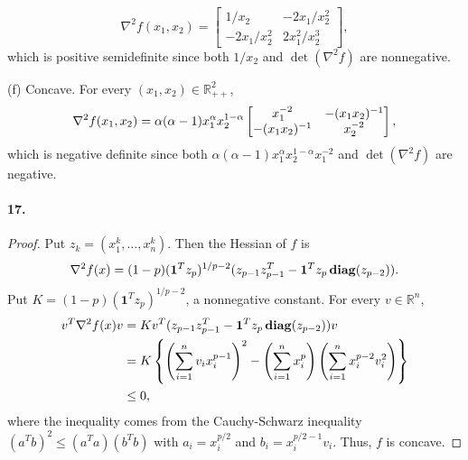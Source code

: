 \begin{solution}
\[      \nabla^2f(x_1,x_2) = \begin{bmatrix}
        1/x_2 & -2x_1/x_2^2 \\ -2x_1/x_2^2 & 2x_1^2/x_2^3
      \end{bmatrix},
    \]
    which is positive semidefinite since both $1/x_2$ and $\det(\nabla^2 f)$ are
    nonnegative. \par
    (f) Concave. For every $(x_1,x_2)\in\mathbb{R}_{++}^2$,
    \[
      \nabla^2f(x_1,x_2) = \alpha(\alpha-1)x_1^\alpha x_2^{1-\alpha}
      \begin{bmatrix}
        x_1^{-2} & -(x_1x_2)^{-1} \\ -(x_1x_2)^{-1} & x_2^{-2}
      \end{bmatrix},
    \]
    which is negative definite since both $\alpha(\alpha-1)x_1^\alpha
    x_2^{1-\alpha}x_1^{-2}$ and $\det(\nabla^2 f)$ are negative.
  \end{solution}
  
  \paragraph{17.}
  \begin{proof}
    Put $z_k=(x_1^k,\dots,x_n^k)$. Then the Hessian of $f$ is
    \[
      \nabla^2f(x)=
      (1-p)(\mathbf{1}^Tz_p)^{1/p-2}
      (z_{p-1}z_{p-1}^T-\mathbf{1}^Tz_p\operatorname{\mathbf{diag}}(z_{p-2})).
    \]
    Put $K=(1-p)(\mathbf{1}^Tz_p)^{1/p-2}$, a nonnegative constant. For every 
    $v\in\mathbb{R}^n$,
    \begin{align*}
      v^T\nabla^2f(x)v
      &=Kv^T(z_{p-1}z_{p-1}^T-\mathbf{1}^Tz_p\operatorname{\mathbf{diag}}(z_{p-2}))v \\
      &=K\left\{\left(\sum_{i=1}^nv_ix_i^{p-1}\right)^2-
      \left(\sum_{i=1}^nx_i^p\right)
      \left(\sum_{i=1}^nx_i^{p-2}v_i^2\right)\right\}\\
      &\le 0,
    \end{align*}
    where the inequality comes from the Cauchy-Schwarz inequality $(a^Tb)^2\le
    (a^Ta)(b^Tb)$ with $a_i=x_i^{p/2}$ and $b_i=x_i^{p/2-1}v_i$. Thus, $f$ is 
    concave.
  \end{proof}
  
